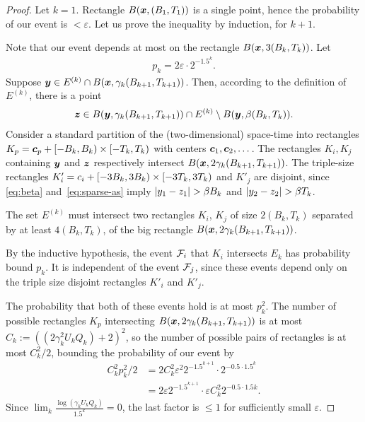 \documentclass[12pt]{memoir}
\renewcommand{\le}{\leq}
\def\B{B}
\def\U{U}
\newcommand{\Tu}{T}
\begin{document}
\begin{proof}
Let \( k=1 \).
Rectangle \( B(\vek{x},(\B_1, \Tu_{1})) \) is a single point, hence
the probability of our event is \( <\varepsilon \).
Let us prove the inequality by induction, for \( k+1 \).

Note that our 
event depends at most on the rectangle \( B(\vek{x},3(\B_{k}, \Tu_{k})) \).
Let
\begin{align*}
   p_{k}=2\varepsilon\cdot 2^{-1.5^{k}}.
\end{align*}
Suppose \( \vek{y} \in E^{(k)}\cap B(\vek{x},\gamma_{k}(\B_{k+1}, \Tu_{k+1})  ) \).
Then, according to the definition of \( E^{(k)} \),  there is a point
\begin{align}\label{eq:sparse-as}
 \vek{z} \in
 B(\vek{y},\gamma_{k}(\B_{k+1},\Tu_{k+1}))\cap E^{(k)}\setminus B(\vek{y},\beta(\B_{k}, \Tu_{k})).
 \end{align}
Consider a standard partition of the (two-dimensional) space-time into
rectangles \( K_{p}=\vek{c}_{p}+\lint{-\B_{k}}{\B_k}\times \lint{-\Tu_{k}}{\Tu_{k}} \)
with centers \( \boldsymbol{c}_{1},\boldsymbol{c}_{2},\dots \).
The rectangles \( K_{i},K_{j} \) containing \( \boldsymbol{y} \) and \( \boldsymbol{z} \)
respectively intersect \( B(\vek{x}, 2\gamma_{k}(\B_{k+1}, \Tu_{k+1})) \).
The triple-size rectangles 
\( K'_{i}=c_{i} + \lint{-3\B_{k}}{3\B_k}\times \lint{-3\Tu_{k}}{3\Tu_{k}} \) and
\( K'_{j} \) are disjoint, since \eqref{eq:beta} and~\eqref{eq:sparse-as} imply
 \( \abs{y_1 - z_1}>\beta\B_{k} \) and \( \abs{y_2 - z_2}>\beta\Tu_{k} \).

The set \( E^{(k)} \) must intersect two rectangles \( K_{i} \),
\( K_{j} \) of size \( 2(\B_{k}, \Tu_{k}) \) separated by at least \( 4(\B_{k}, \Tu_{k}) \),
of the big rectangle \( B(\vek{x},2\gamma_{k}(\B_{k+1}, \Tu_{k+1})) \).

By the inductive hypothesis, the event \( \mathcal{F}_{i} \) that
\( K_{i} \) intersects \( E_{k} \) has probability bound \( p_{k} \).
It is independent of the event \( \mathcal{F}_{j} \), since these events depend
only on the triple size disjoint rectangles \( K'_{i} \) and \( K'_{j} \).

The probability that both of these events hold is at most \( p_{k}^{2} \).
The number of possible rectangles
\( K_{p} \) intersecting \( B(\vek{x},2\gamma_{k}(\B_{k+1}, \Tu_{k+1})) \) is
at most
\( C_{k}:=((2\gamma_{k}^{2}\U_{k} Q_{k})+2)^{2} \), so the number of possible pairs of rectangles
is at most \( C_{k}^{2}/2 \), bounding the probability of our event by
 \begin{align*}
   C_{k}^{2}p_{k}^{2}/2
    &=
      2 C_{k}^{2}\varepsilon^{2} 2^{-1.5^{k+1}}\cdot 2^{-0.5\cdot 1.5^{k}}
   \\ &=2\varepsilon 2^{-1.5^{k+1}} \cdot \varepsilon
        C_{k}^{2}2^{-0.5\cdot 1.5{k}}.
 \end{align*}
Since \( \lim_{k}\frac{\log{(\gamma_{k}\U_{k} Q_k)}}{1.5^k}=0 \),
the last factor is \( \le 1 \) for sufficiently small  \( \varepsilon \).
\end{proof}
\end{document}
